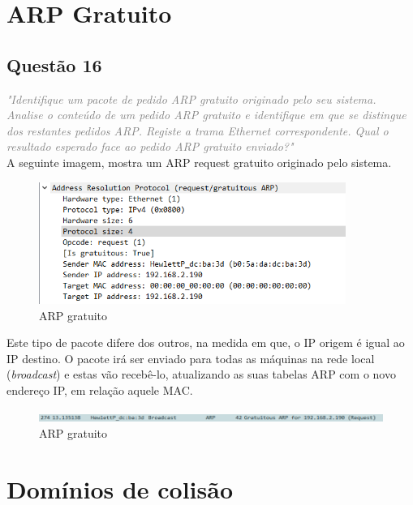 \documentclass{llncs}
\newcommand{\questionE}[1]{\textcolor{gray}{\textit{"#1"}}}
\begin{document}
\section{ARP Gratuito}

\subsection{Questão 16}
\hspace{3mm} 
\questionE{Identifique um pacote de pedido ARP gratuito originado pelo seu sistema. Analise o conteúdo de um pedido ARP gratuito e identifique em que se distingue dos restantes pedidos ARP. Registe a trama Ethernet correspondente. Qual o resultado esperado face ao pedido ARP gratuito enviado?}\\ 

A seguinte imagem, mostra um ARP request gratuito originado pelo sistema.

\begin{figure}[H]
\begin{center}
\includegraphics[width=10cm]{16_gratuito_1.PNG}
\end{center}
\caption{ARP gratuito}
\end{figure}

Este tipo de pacote difere dos outros, na medida em que, o IP origem é igual ao IP destino. O pacote irá ser enviado para todas as máquinas na rede local (\textit{broadcast}) e estas vão recebê-lo, atualizando as suas tabelas ARP com o novo endereço IP, em relação aquele MAC.

\begin{figure}[H]
\begin{center}
\includegraphics[width=13cm]{16_gratuito_2.PNG}
\end{center}
\caption{ARP gratuito}
\end{figure}

\clearpage

\section{Domínios de colisão}
\end{document}
